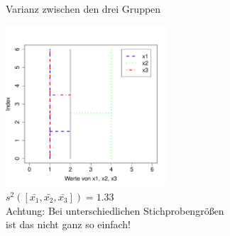 \begin{frame}
  {Varianz zwischen den drei Gruppen}
  
  \begin{center}
    \includegraphics[width=0.45\textwidth]{graphics/anova_var_between}\\
    $s^2([\bar{x_1}, \bar{x_2}, \bar{x_3}])=1.33$\\
    \vspace{0.5cm}
    Achtung: Bei unterschiedlichen Stichprobengrößen\\
    ist das nicht ganz so einfach!
  \end{center}
\end{frame}



